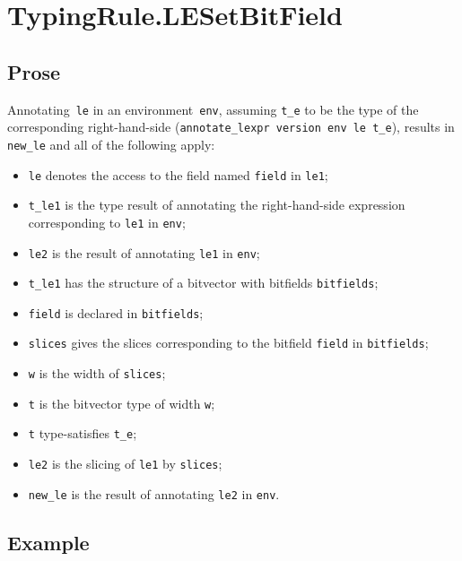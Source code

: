 \documentclass{book}
\begin{document}

\section{TypingRule.LESetBitField \label{sec:TypingRule.LESetBitField}}

    \subsection{Prose}
   Annotating~\texttt{le} in an environment~\texttt{env}, assuming
\texttt{t\_e} to be the type of the corresponding right-hand-side
(\texttt{annotate\_lexpr version env le t\_e}), results in \texttt{new\_le} and
all of the following apply:
   \begin{itemize}
   \item \texttt{le} denotes the access to the field named \texttt{field} in \texttt{le1};
   \item \texttt{t\_le1} is the type result of annotating the right-hand-side expression corresponding to \texttt{le1} in \texttt{env};
   \item \texttt{le2} is the result of annotating \texttt{le1} in \texttt{env};
   \item \texttt{t\_le1} has the structure of a bitvector with bitfields \texttt{bitfields};
   \item \texttt{field} is declared in \texttt{bitfields};
   \item \texttt{slices} gives the slices corresponding to the bitfield \texttt{field} in
      \texttt{bitfields};
   \item \texttt{w} is the width of \texttt{slices};
   \item \texttt{t} is the bitvector type of width \texttt{w};
   \item \texttt{t} type-satisfies \texttt{t\_e};
   \item \texttt{le2} is the slicing of \texttt{le1} by \texttt{slices};
   \item \texttt{new\_le} is the result of annotating \texttt{le2} in \texttt{env}.
   \end{itemize}

  \subsection{Example}
\end{document}
